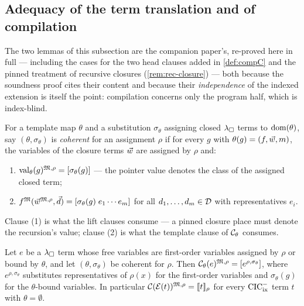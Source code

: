 \subsection{Adequacy of the term translation and of compilation}
\label{sec:semantics-adequacy}

The two lemmas of this subsection are the companion paper's, re-proved
here in full --- including the cases for the two head clauses added in
\cref{def:compC} and the pinned treatment of recursive closures
(\cref{rem:rec-closure}) --- both because the soundness proof cites
their content and because their \emph{independence} of the indexed
extension is itself the point: compilation concerns only the program
half, which is index-blind.

\begin{definition}
\label{def:coherent}
For a template map $\theta$ and a substitution $\sigma_\theta$ assigning
closed $\lambda_{\square}$ terms to $\mathrm{dom}(\theta)$, say $(\theta, \sigma_\theta)$ is
\emph{coherent} for an assignment $\rho$ if for every $g$ with
$\theta(g) = (f, \vec{w}, m)$, the variables of the closure terms
$\vec{w}$ are assigned by $\rho$ and:
\begin{enumerate}[leftmargin=2em]
\item $\mathrm{val}_{\theta}(g)^{\mathfrak{M},\rho} = [\sigma_\theta(g)]$ --- the
  pointer value denotes the class of the assigned closed term;
\item $f^{\mathfrak{M}}(\vec{w}^{\mathfrak{M},\rho}, \vec{d}) =
  [\sigma_\theta(g)\;e_1 \cdots e_m]$ for all $d_1, \dots, d_m \in
  \mathcal{D}$ with representatives $e_i$.
\end{enumerate}
Clause (1) is what the lift clauses consume --- a pinned closure place
must denote the recursion's value; clause (2) is what the template
clause of $\mathcal{C}_\theta$ consumes.
\end{definition}

\begin{lemma}
\label{lem:comp-adequacy}
Let $e$ be a $\lambda_{\square}$ term whose free variables are first-order variables
assigned by $\rho$ or bound by $\theta$, and let $(\theta,
\sigma_\theta)$ be coherent for $\rho$.  Then $\mathcal{C}_\theta(e)^{\mathfrak{M},\rho} = [e^{\rho, \sigma_\theta}]$, where $e^{\rho,\sigma_\theta}$
substitutes representatives of $\rho(x)$ for the first-order variables
and $\sigma_\theta(g)$ for the $\theta$-bound variables.  In particular
$\mathcal{C}(\mathcal{E}(t))^{\mathfrak{M},\rho} = [\![ t ]\!]_\rho$ for every $\mathrm{CIC}^{-}_{\mathrm{ix}}$ term
$t$ with $\theta = \emptyset$.
\end{lemma}

